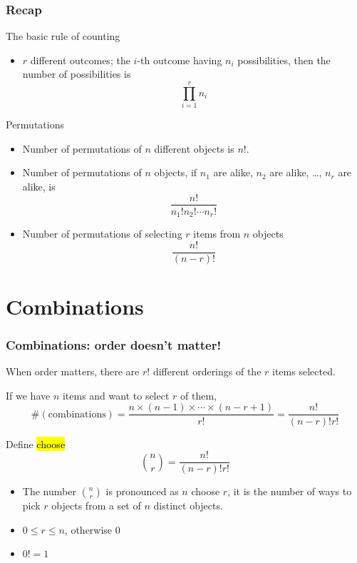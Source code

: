 \documentclass[slidestop,compress,mathserif]{beamer}
\begin{document}
\begin{frame}\frametitle{Recap}

The basic rule of counting
\begin{itemize}
\item $r$ different outcomes; the $i$-th outcome having $n_i$ possibilities,
then the number of possibilities is
\[
\prod_{i=1}^r n_i
\]

\end{itemize}

Permutations
\begin{itemize}
\item Number of permutations of $n$ different objects is $n!$.
\item Number of permutations of $n$ objects, if $n_1$ are alike, $n_2$ are alike, \ldots, $n_r$ are alike, is
\[
\frac{n!}{n_1! n_2! \cdots n_r!}
\]
\item Number of permutations of selecting $r$ items from $n$ objects
\[
\frac{n!}{(n-r)!}
\]
\end{itemize}

\end{frame}


\section{Combinations}
\begin{frame}[fragile]\frametitle{Combinations: order doesn't matter!}

When order matters, there are $r!$ different orderings of the $r$ items selected.

\begin{dinglist}{\DingListSymbolA}
\item If we have $n$ items and want to select $r$ of them,
\[
\#(\text{combinations}) = \frac{n \times (n-1) \times \cdots \times (n-r+1)}{r!} = \frac{n!}{(n-r)!r!}
\]

\pause
\item Define \hl{choose}
\[ {n \choose r} = \frac{n!}{(n-r)!r!}\]
\end{dinglist}

\pause
\begin{itemize}
\item The number ${n \choose r}$ is pronounced as $n$ choose $r$, it is the number of ways to pick
$r$ objects from a set of $n$ distinct objects.

\item $0 \leq r \leq n$, otherwise $0$
\pause
\item $0! = 1$
\end{itemize}

\end{frame}
\end{document}
